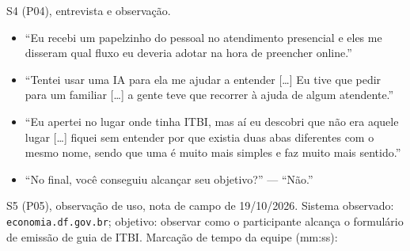 \documentclass[
  12pt,
  oneside,
  a4paper,
  chapter=TITLE,
  section=TITLE,
  english,
  brazilian
]{abntex2}
\begin{document}
\begin{apendicesenv}
S4 (P04), entrevista e observação.
\begin{itemize}
  \item ``Eu recebi um papelzinho do pessoal no atendimento presencial e eles me
    disseram qual fluxo eu deveria adotar na hora de preencher online.''
  \item ``Tentei usar uma IA para ela me ajudar a entender [\ldots] Eu tive que pedir
    para um familiar [\ldots] a gente teve que recorrer à ajuda de algum atendente.''
  \item ``Eu apertei no lugar onde tinha ITBI, mas aí eu descobri que não era
    aquele lugar [\ldots] fiquei sem entender por que existia duas abas diferentes
    com o mesmo nome, sendo que uma é muito mais simples e faz muito mais sentido.''
  \item ``No final, você conseguiu alcançar seu objetivo?'' --- ``Não.''
\end{itemize}

S5 (P05), observação de uso, nota de campo de 19/10/2026. Sistema
observado: \texttt{economia.df.gov.br}; objetivo: observar como o participante
alcança o formulário de emissão de guia de ITBI. Marcação de tempo da equipe
(mm:ss):


\end{apendicesenv}
\end{document}
